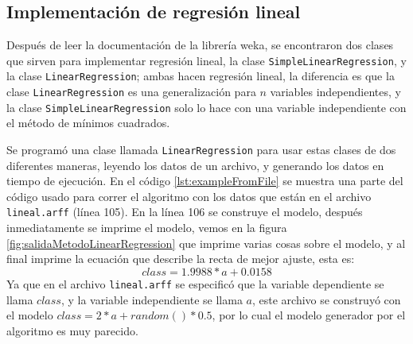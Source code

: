 \subsection{Implementación de regresión lineal}
Después de leer la documentación de la librería weka, se encontraron dos clases que sirven para implementar regresión lineal, la clase \texttt{SimpleLinearRegression}, y la clase \texttt{LinearRegression}; 
ambas hacen regresión lineal, la diferencia es que la clase \texttt{LinearRegression} es una generalización para $n$ variables independientes, y la clase \texttt{SimpleLinearRegression} solo lo hace con una variable independiente con el método de mínimos cuadrados.

Se programó una clase llamada \texttt{LinearRegression} para usar estas clases de dos diferentes maneras, leyendo los datos de un archivo, y generando los datos en tiempo de ejecución. 
En el código \ref{lst:exampleFromFile} se muestra una parte del código usado para correr el algoritmo con los datos que están en el archivo \texttt{lineal.arff} (línea 105).
En la línea 106 se construye el modelo, después inmediatamente se imprime el modelo, vemos en la figura \ref{fig:salidaMetodoLinearRegression} que imprime varias cosas sobre el modelo, y al final imprime la ecuación que describe la recta de mejor ajuste, esta es:
$$class = 1.9988 * a + 0.0158$$
Ya que en el archivo \texttt{lineal.arff} se especificó que la variable dependiente se llama $class$, y la variable independiente se llama $a$, este archivo se construyó con el modelo $class = 2*a + random()*0.5$, por lo cual el modelo generador por el algoritmo es muy parecido.


